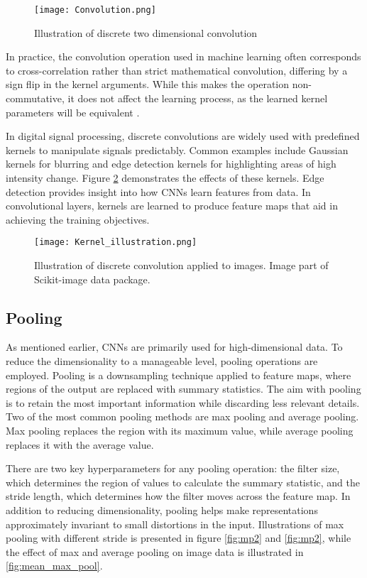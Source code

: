 \documentclass[../../thesis.tex]{subfiles}
\begin{document}
\begin{figure}[h]
    \texttt{[image: Convolution.png]}
    \centering    
    \caption{Illustration of discrete two dimensional convolution}
    \label{fig:Convolution}
\end{figure}

In practice, the convolution operation used in machine learning often corresponds to cross-correlation rather than strict mathematical convolution, differing by a sign flip in the kernel arguments. While this makes the operation non-commutative, it does not affect the learning process, as the learned kernel parameters will be equivalent \cite{deeplearningbook}.\newline


In digital signal processing, discrete convolutions are widely used with predefined kernels to manipulate signals predictably. Common examples include Gaussian kernels for blurring and edge detection kernels for highlighting areas of high intensity change. Figure \ref{fig:kernelIllustration} demonstrates the effects of these kernels. Edge detection provides insight into how CNNs learn features from data. In convolutional layers, kernels are learned to produce feature maps that aid in achieving the training objectives.
\begin{figure}[h]
    \centering
    \texttt{[image: Kernel\_illustration.png]}
    \caption{Illustration of discrete convolution applied to images. Image part of Scikit-image data package.}
    \label{fig:kernelIllustration}
\end{figure}

\subsection{Pooling}
As mentioned earlier, CNNs are primarily used for high-dimensional data. To reduce the dimensionality to a manageable level, pooling operations are employed. Pooling is a downsampling technique applied to feature maps, where regions of the output are replaced with summary statistics. The aim with pooling is to retain the most important information while discarding less relevant details. Two of the most common pooling methods are max pooling and average pooling. Max pooling replaces the region with its maximum value, while average pooling replaces it with the average value.\newline

There are two key hyperparameters for any pooling operation: the filter size, which determines the region of values to calculate the summary statistic, and the stride length, which determines how the filter moves across the feature map. In addition to reducing dimensionality, pooling helps make representations approximately invariant to small distortions in the input. Illustrations of max pooling with different stride is presented in figure \ref{fig:mp2} and \ref{fig:mp2}, while the effect of max and average pooling on image data is illustrated in \ref{fig:mean_max_pool}.\newline
\end{document}
